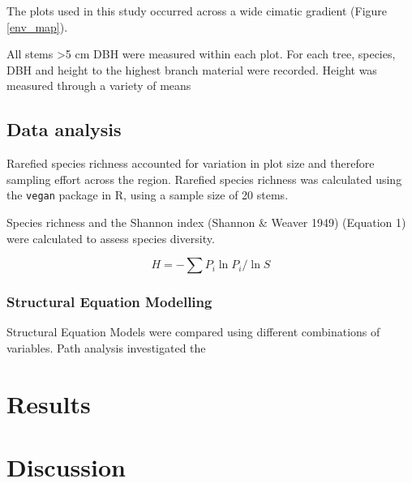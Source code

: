 \documentclass[11pt,a4paper]{article}
\begin{document}
The plots used in this study occurred across a wide cimatic gradient (Figure \ref{env_map}). 

All stems \textgreater{}5 cm DBH were measured within each plot. For each tree, species, DBH and height to the highest branch material were recorded. Height was measured through a variety of means 


\subsection{Data analysis}
Rarefied species richness accounted for variation in plot size and therefore sampling effort across the region. Rarefied species richness was calculated using the \verb|vegan| package in R, using a sample size of 20 stems.

Species richness and the Shannon index (Shannon \& Weaver 1949) (Equation 1) were calculated to assess species diversity.

\begin{equation}
	H = -\sum{}P_i \ln{P_i} / \ln{S} 
\end{equation}

\subsubsection{Structural Equation Modelling}

Structural Equation Models were compared using different combinations of variables. Path analysis investigated the 

\section{Results}

\section{Discussion}
\end{document}
